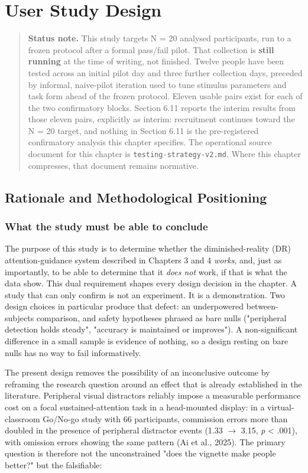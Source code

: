 \chapter{User Study Design}

\begin{quote}
\textbf{Status note.} This study targets N = 20 analysed participants, run to a frozen protocol after a
formal pass/fail pilot. That collection is \textbf{still running} at the time of writing, not finished.
Twelve people have been tested across an initial pilot day and three further collection days,
preceded by informal, naive-pilot iteration used to tune stimulus parameters and task form ahead of
the frozen protocol. Eleven usable pairs exist for each of the two confirmatory blocks. Section 6.11
reports the interim results
from those eleven pairs, explicitly as interim: recruitment continues toward the N = 20 target, and
nothing in Section 6.11 is the pre-registered confirmatory analysis this chapter specifies. The
operational source document for this chapter is \verb|testing-strategy-v2.md|. Where this chapter
compresses, that document remains normative.
\end{quote}

\section{Rationale and Methodological Positioning}

\subsection{What the study must be able to conclude}

The purpose of this study is to determine whether the diminished-reality (DR) attention-guidance
system described in Chapters 3 and 4 \textit{works}, and, just as importantly, to be able to determine that
it \textit{does not} work, if that is what the data show. This dual requirement shapes every design decision
in the chapter. A study that can only confirm is not an experiment. It is a demonstration. Two design
choices in particular produce that defect: an underpowered between-subjects comparison, and safety
hypotheses phrased as bare nulls ("peripheral detection holds steady", "accuracy is maintained or
improves"). A non-significant difference in a small sample is evidence of nothing, so a design
resting on bare nulls has no way to fail informatively.

The present design removes the possibility of an inconclusive outcome by reframing the research
question around an effect that is already established in the literature. Peripheral visual
distractors reliably impose a measurable performance cost on a focal sustained-attention task in a
head-mounted display: in a virtual-classroom Go/No-go study with 66 participants, commission errors
more than doubled in the presence of peripheral distractor events (1.33 $\rightarrow$ 3.15, \textit{p} < .001), with
omission errors showing the same pattern (Ai et al., 2025). The primary question is therefore not the unconstrained "does the
vignette make people better?" but the falsifiable:

